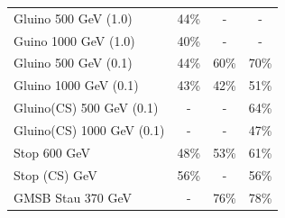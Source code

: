 \begin{table}
\begin{center}
\begin{tabular}{|l|c|c|c|}


Gluino 500 GeV (1.0)   & 44\% & -    & -  \\
Guino 1000 GeV (1.0)   & 40\% & -    & - \\ 
Gluino 500 GeV (0.1)   & 44\% & 60\%    & 70\% \\
Gluino 1000 GeV (0.1)  & 43\% & 42\% & 51\% \\
Gluino(CS) 500 GeV (0.1)   & -    & -    & 64\% \\
Gluino(CS) 1000 GeV (0.1)   & -    & -    & 47\% \\
Stop 600 GeV     & 48\% & 53\% & 61\% \\
Stop (CS) GeV    & 56\% & -    & 56\% \\
GMSB Stau 370 GeV    & -    & 76\%    & 78\% \\
\hline
   \end{tabular}
 \end{center}
\end{table}


